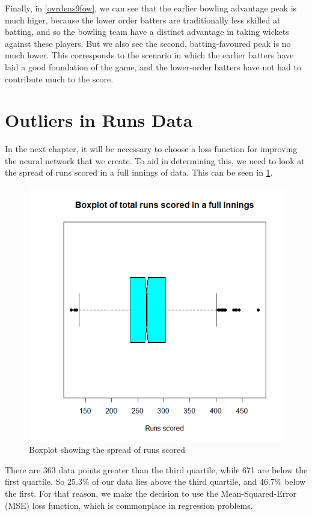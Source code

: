 Finally, in \ref{ovrdens9fow}, we can see that the earlier bowling advantage peak is much higer, because the lower order batters are traditionally less skilled 
at batting, and so the bowling team have a distinct advantage in taking wickets against these players. But we also see the second, batting-favoured peak is no much lower.
This corresponds to the scenario in which the earlier batters have laid a good foundation of the game, and the lower-order batters have not had to contribute much to the score.

\section{Outliers in Runs Data}
\label{mse}
In the next chapter, it will be necessary to choose a loss function for improving the neural network that we create. To aid in determining this, we need to look at the
spread of runs scored in a full innings of data. This can be seen in \ref{runsbox}.

\begin{figure}[h]
    \centering
    \includegraphics[scale=0.5]{figures/runsbox.png}
    \caption{Boxplot showing the spread of runs scored}
    \label{runsbox}
\end{figure}

There are 363 data points greater than the third quartile, while 671 are below the first quartile. So $25.3\%$ of our data lies above the third quartile, and
$46.7\%$ below the first. For that reason, we make the decision to use the Mean-Squared-Error (MSE) loss function, which is commonplace in regression problems.